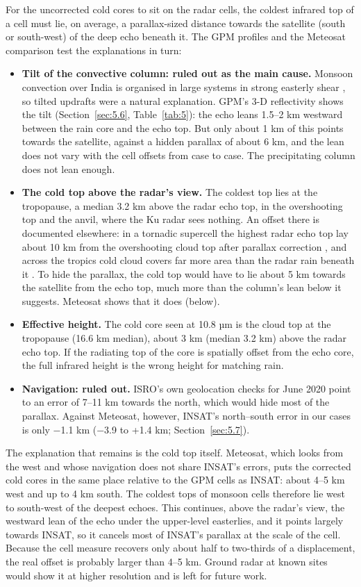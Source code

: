 For the uncorrected cold cores to sit on the radar cells, the coldest infrared top of a cell must lie, on average, a parallax-sized distance towards the satellite (south or south-west) of the deep echo beneath it. The GPM profiles and the Meteosat comparison test the explanations in turn:

\begin{itemize}
\tightlist
\item
  \textbf{Tilt of the convective column: ruled out as the main cause.} Monsoon convection over India is organised in large systems in strong easterly shear \citep{houze2007,romatschke2011}, so tilted updrafts were a natural explanation. GPM's 3-D reflectivity shows the tilt (Section~\ref{sec:5.6}, Table~\ref{tab:5}): the echo leans 1.5--2 km westward between the rain core and the echo top. But only about 1 km of this points towards the satellite, against a hidden parallax of about 6 km, and the lean does not vary with the cell offsets from case to case. The precipitating column does not lean enough.
\item
  \textbf{The cold top above the radar's view.} The coldest top lies at the tropopause, a median 3.2 km above the radar echo top, in the overshooting top and the anvil, where the Ku radar sees nothing. An offset there is documented elsewhere: in a tornadic supercell the highest radar echo top lay about 10 km from the overshooting cloud top after parallax correction \citep{bluestein2019}, and across the tropics cold cloud covers far more area than the radar rain beneath it \citep{liu2007}. To hide the parallax, the cold top would have to lie about 5 km towards the satellite from the echo top, much more than the column's lean below it suggests. Meteosat shows that it does (below).
\item
  \textbf{Effective height.} The cold core seen at 10.8 µm is the cloud top at the tropopause (16.6 km median), about 3 km (median 3.2 km) above the radar echo top. If the radiating top of the core is spatially offset from the echo core, the full infrared height is the wrong height for matching rain.
\item
  \textbf{Navigation: ruled out.} ISRO's own geolocation checks for June 2020 point to an error of 7--11 km towards the north, which would hide most of the parallax. Against Meteosat, however, INSAT's north--south error in our cases is only −1.1 km (−3.9 to +1.4 km; Section~\ref{sec:5.7}).
\end{itemize}

The explanation that remains is the cold top itself. Meteosat, which looks from the west and whose navigation does not share INSAT's errors, puts the corrected cold cores in the same place relative to the GPM cells as INSAT: about 4--5 km west and up to 4 km south. The coldest tops of monsoon cells therefore lie west to south-west of the deepest echoes. This continues, above the radar's view, the westward lean of the echo under the upper-level easterlies, and it points largely towards INSAT, so it cancels most of INSAT's parallax at the scale of the cell. Because the cell measure recovers only about half to two-thirds of a displacement, the real offset is probably larger than 4--5 km. Ground radar at known sites would show it at higher resolution and is left for future work.

